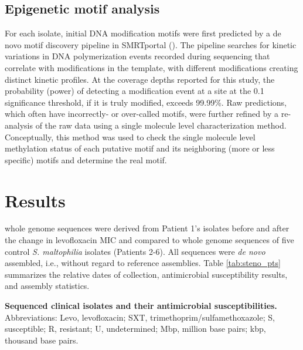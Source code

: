 \subsection{Epigenetic motif analysis}

For each isolate, initial DNA modification motifs were first predicted by a de novo motif discovery pipeline in SMRTportal (\texttt{}). The pipeline searches for kinetic variations in DNA polymerization events recorded during sequencing that correlate with modifications in the template, with different modifications creating distinct kinetic profiles.\autocite{Clark2012,Fang2012} At the coverage depths reported for this study, the probability (power) of detecting a modification event at a site at the 0.1 significance threshold, if it is truly modified, exceeds 99.99\%.\autocite{Fang2012} Raw predictions, which often have incorrectly- or over-called motifs, were further refined by a re-analysis of the raw data using a single molecule level characterization method.\autocite{Beaulaurier2015} Conceptually, this method was used to check the single molecule level methylation status of each putative motif and its neighboring (more or less specific) motifs and determine the real motif. 

\pagebreak

\section{Results}

 whole genome sequences were derived from Patient 1’s isolates before and after the change in levofloxacin MIC and compared to whole genome sequences of five control \emph{S. maltophilia} isolates (Patients 2-6). All sequences were \emph{de novo} assembled, i.e., without regard to reference assemblies. Table \ref{tab:steno_pts} summarizes the relative dates of collection, antimicrobial susceptibility results, and assembly statistics.

\begin{table*}[ht]
  
  \caption[Sequenced clinical isolates and their antimicrobial susceptibilities]{\textbf{Sequenced clinical isolates and their antimicrobial susceptibilities.} Abbreviations: Levo, levofloxacin; SXT, trimethoprim/sulfamethoxazole; S, susceptible; R, resistant; U, undetermined; Mbp, million base pairs; kbp, thousand base pairs.
  }
  \label{tab:steno_pts}
\end{table*}

